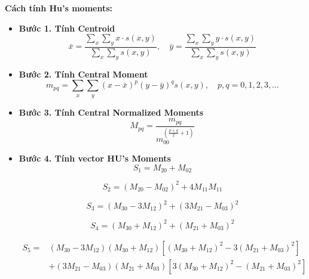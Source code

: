 \documentclass[a4paper]{article}
\begin{document}
\textbf{Cách tính Hu’s moments: \cite{hu1962}}
\begin{itemize}[label={}]
    \item \textbf{Bước 1. Tính Centroid}
    \begin{equation}
        \label{eq:centroid}
        \bar{x} = \frac{\sum_{x}\sum_{y} x \cdot s(x,y)}{\sum_{x}\sum_{y} s(x,y)}, \quad \bar{y} = \frac{\sum_{x}\sum_{y} y \cdot s(x,y)}{\sum_{x}\sum_{y} s(x,y)}
    \end{equation}
    \item \textbf{Bước 2. Tính Central Moment}
    \begin{equation}
    \label{eq:moment}
    m_{pq} = \sum_{x} \sum_{y} (x - \bar{x})^p (y - \bar{y})^q s(x,y), \quad p, q = 0, 1, 2, 3, \ldots
    \end{equation}
    \item \textbf{Bước 3. Tính Central Normalized Moments}
    \begin{equation}
    \label{eq:normalized_moment}
    M_{pq} = \frac{m_{pq}}{m_{00}^{\left(\frac{p+q}{2}+1\right)}}
    \end{equation}
    \item \textbf{Bước 4. Tính vector HU's Moments}
    \begin{equation}
    \label{eq:S1}
    S_1 = M_{20} + M_{02}
    \end{equation}

    \begin{equation}
    \label{eq:S2}
    S_2 = (M_{20} - M_{02})^2 + 4M_{11}M_{11}
    \end{equation}
    
    \begin{equation}
    \label{eq:S3}
    S_3 = (M_{30} - 3M_{12})^2 + (3M_{21} - M_{03})^2
    \end{equation}
    
    \begin{equation}
    \label{eq:S4}
    S_4 = (M_{30} + M_{12})^2 + (M_{21} + M_{03})^2
    \end{equation}
    
    \begin{equation}
    \label{eq:S5}
    \begin{aligned}
    S_5 = & (M_{30} - 3M_{12})(M_{30} + M_{12})[(M_{30} + M_{12})^2 - 3(M_{21} + M_{03})^2] \\
    & + (3M_{21} - M_{03})(M_{21} + M_{03})[3(M_{30} + M_{12})^2 - (M_{21} + M_{03})^2]
    \end{aligned}
    \end{equation}
    

\end{itemize}
\end{document}
